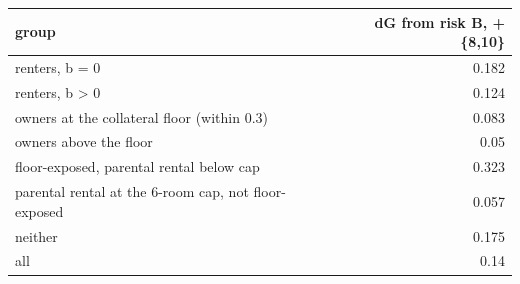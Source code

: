 \begin{tabular}{lr}
\toprule
group & dG from risk B, +\{8,10\} \\
\midrule
renters, b = 0 & 0.182 \\
renters, b > 0 & 0.124 \\
owners at the collateral floor (within 0.3) & 0.083 \\
owners above the floor & 0.05 \\
floor-exposed, parental rental below cap & 0.323 \\
parental rental at the 6-room cap, not floor-exposed & 0.057 \\
neither & 0.175 \\
all & 0.14 \\
\bottomrule
\end{tabular}
